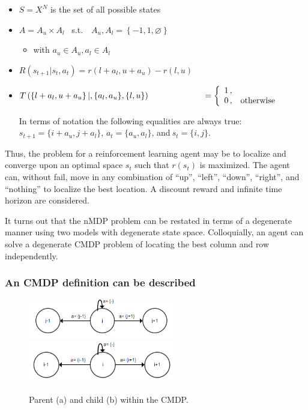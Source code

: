 \documentclass[compsoc,journal,letterpaper,10pt,draftcls,twocolumn]{IEEEtran}
\begin{document}
\begin{itemize}
\item
  \(S = X^{N}\) is the set of all possible states
\item
  \(A = A_{u} \times A_{l} \) \ s.t.\  \ 
  \( A_{u}, A_{l} = \left\{ - 1,1,\varnothing \right\}\)

  \begin{itemize}
  \item
    with \(a_{u} \in A_{u}, a_{l} \in A_{l}\)
  \end{itemize}
\item
  \(R\left( s_{t + 1}|s_{t}, a_{t} \right) = r\left( l + a_{l}, u + a_{u} \right) - r(l,u)\)
\item
   $ T\left( \left\{ l + a_{l},u + a_{u} \right\}|,\{ a_{l},a_{u}\},\{ l,u\} \right) \\ {\ }\qquad\qquad\qquad = \left\{ \begin{array}{ll} 
1\,, & \\
0\,, & \text{otherwise}
\end{array}\right.$

  In terms of notation the following equalities are always true:
  \(s_{t + 1} = \{ i + a_{u}, j + a_{l}\}\), \(a_{t} = \{ a_{u},a_{l}\}\), and\(\ s_{t} = \{ i,j\}\).
\end{itemize}

Thus, the problem for a reinforcement learning agent may be to localize
and converge upon an optimal space \(s_{t}\) such that \(r(s_{t})\) is
maximized. The agent can, without fail, move in any combination of
``up'', ``left'', ``down'', ``right'', and ``nothing'' to localize the
best location. A discount reward and infinite time horizon are
considered.

It turns out that the nMDP problem can be restated in terms of a
degenerate manner using two models with degenerate state space.
Colloquially, an agent can solve a degenerate CMDP problem of locating
the best column and row independently.

\subsubsection[An CMDP definition can be
described]{ An CMDP definition can be described}\label{an-cmdp-definition-can-be-described}

\begin{figure}[!t]
\centering
\includegraphics[width=2.5in]{media/image3.png}\\
\includegraphics[width=2.5in]{media/image4.png}\\
\caption{\label{fig:figure2} Parent (a) and child (b) within the CMDP.}
\end{figure}
\end{document}
